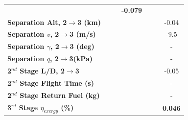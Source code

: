 \begin{table}[ht]
\begin{tabular}{l c c c c c c}
		& \textbf{\secondExergyEffCdOneHundredFive}
		& \textbf{\secondExergyEffCdOneHundredTen}
		& \textbf{-0.079}
		\\
		\textbf{Separation Alt, 2$\rightarrow$3 (km)}
		& \secondthirdSeparationAltCdNinety
		& \secondthirdSeparationAltCdNinetyFive
		& \secondthirdSeparationAltCdStandard
		& \secondthirdSeparationAltCdOneHundredFive
		& \secondthirdSeparationAltCdOneHundredTen
		&-0.04
		\\
		\textbf{Separation $v$, 2$\rightarrow$3 (m/s)}
		& \secondthirdSeparationvCdNinety
		& \secondthirdSeparationvCdNinetyFive
		& \secondthirdSeparationvCdStandard
		& \secondthirdSeparationvCdOneHundredFive
		& \secondthirdSeparationvCdOneHundredTen
		&-9.5
		\\
		\textbf{Separation $\gamma$, 2$\rightarrow$3 (deg)}
		& \secondthirdSeparationgammaCdNinety
		& \secondthirdSeparationgammaCdNinetyFive
		& \secondthirdSeparationgammaCdStandard
		& \secondthirdSeparationgammaCdOneHundredFive
		& \secondthirdSeparationgammaCdOneHundredTen
		& -
		\\
		\textbf{Separation $q$, 2$\rightarrow$3(kPa)}
		& \secondthirdSeparationqCdNinety
		& \secondthirdSeparationqCdNinetyFive
		& \secondthirdSeparationqCdStandard
		& \secondthirdSeparationqCdOneHundredFive
		& \secondthirdSeparationqCdOneHundredTen
		& -
		\\
		\textbf{2$^{nd}$ Stage L/D, 2$\rightarrow$3}
		& \secondthirdSeparationLDCdNinety
		& \secondthirdSeparationLDCdNinetyFive
		& \secondthirdSeparationLDCdStandard
		& \secondthirdSeparationLDCdOneHundredFive
		& \secondthirdSeparationLDCdOneHundredTen
		&-0.05
		\\
		\textbf{2$^{nd}$ Stage Flight Time (s)}
		& \secondFlightTimeCdNinety
		& \secondFlightTimeCdNinetyFive
		& \secondFlightTimeCdStandard
		& \secondFlightTimeCdOneHundredFive
		& \secondFlightTimeCdOneHundredTen
		& -
		\\
		\textbf{2$^{nd}$ Stage Return Fuel (kg)}
		& \returnFuelCdNinety
		& \returnFuelCdNinetyFive
		& \returnFuelCdStandard
		& \returnFuelCdOneHundredFive
		& \returnFuelCdOneHundredTen
		& -
		\\
		\hline 
		\textbf{3$^{rd}$ Stage $\eta_{exergy}$ (\%)}
		& \textbf{\thirddExergyEffCdNinety}
		& \textbf{\thirddExergyEffCdNinetyFive}
		& \textbf{\thirddExergyEffCdStandard}
		& \textbf{\thirddExergyEffCdOneHundredFive}
		& \textbf{\thirddExergyEffCdOneHundredTen}
		& \textbf{0.046}
		\\
		

\end{tabular}
\end{table}
